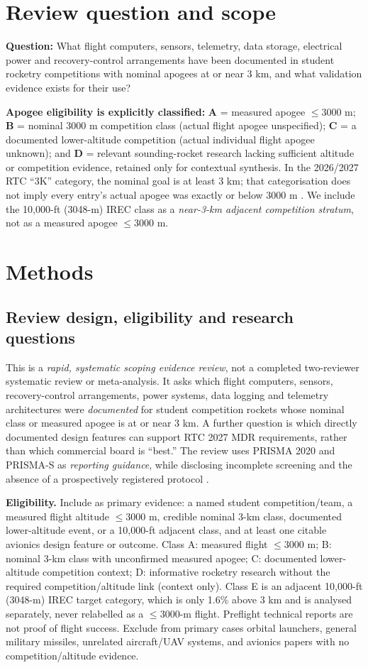 \documentclass[10pt,a4paper]{article}
\begin{document}
\section{Review question and scope}
\textbf{Question:} What flight computers, sensors, telemetry, data storage, electrical power and recovery-control arrangements have been documented in student rocketry competitions with nominal apogees at or near 3 km, and what validation evidence exists for their use?

\textbf{Apogee eligibility is explicitly classified:} \textbf{A} = measured apogee $\leq3000$ m; \textbf{B} = nominal 3000 m competition class (actual flight apogee unspecified); \textbf{C} = a documented lower-altitude competition (actual individual flight apogee unknown); and \textbf{D} = relevant sounding-rocket research lacking sufficient altitude or competition evidence, retained only for contextual synthesis. In the 2026/2027 RTC ``3K'' category, the nominal goal is at least 3 km; that categorisation does not imply every entry's actual apogee was exactly or below 3000 m \cite{rtc2027rules}. We include the 10,000-ft (3048-m) IREC class as a \emph{near-3-km adjacent competition stratum}, not as a measured apogee $\le3000$ m.


\section{Methods}
\subsection{Review design, eligibility and research questions}
This is a \emph{rapid, systematic scoping evidence review}, not a completed two-reviewer systematic review or meta-analysis. It asks which flight computers, sensors, recovery-control arrangements, power systems, data logging and telemetry architectures were \emph{documented} for student competition rockets whose nominal class or measured apogee is at or near 3 km. A further question is which directly documented design features can support RTC 2027 MDR requirements, rather than which commercial board is ``best.'' The review uses PRISMA 2020 and PRISMA-S as \emph{reporting guidance}, while disclosing incomplete screening and the absence of a prospectively registered protocol \cite{page2021,rethlefsen2021}.

\textbf{Eligibility.} Include as primary evidence: a named student competition/team, a measured flight altitude $\leq3000$ m, credible nominal 3-km class, documented lower-altitude event, or a 10,000-ft adjacent class, and at least one citable avionics design feature or outcome. Class A: measured flight $\leq3000$ m; B: nominal 3-km class with unconfirmed measured apogee; C: documented lower-altitude competition context; D: informative rocketry research without the required competition/altitude link (context only). Class E is an adjacent 10,000-ft (3048-m) IREC target category, which is only 1.6\% above 3 km and is analysed separately, never relabelled as a $\le3000$-m flight. Preflight technical reports are not proof of flight success. Exclude from primary cases orbital launchers, general military missiles, unrelated aircraft/UAV systems, and avionics papers with no competition/altitude evidence.
\end{document}

